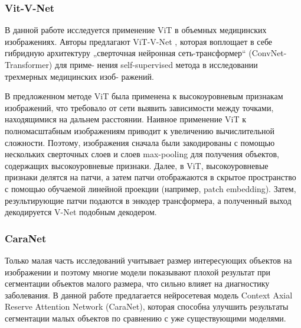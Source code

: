  \subsubsection*{Vit-V-Net}

В данной работе \cite{VitVNet} исследуется применение ViT \cite{Transformers} в объемных медицинских изображениях. 
Авторы предлагают ViT-V-Net \cite{VNet}, которая воплощает в себе гибридную архитектуру
„сверточная нейронная сеть-трансформер“ (ConvNet-Transformer) для приме-
нения self-supervised метода в исследовании трехмерных медицинских изоб-
ражений.\par 

В предложенном методе ViT была применена к высокоуровневым признакам изображений, 
что требовало от сети выявить зависимости между
точками, находящимися на дальнем расстоянии. Наивное применение ViT
к полномасштабным изображениям приводит к увеличению вычислительной
сложности. Поэтому, изображения сначала были закодированы с помощью
нескольких сверточных слоев и слоев max-pooling для получения объектов,
содержащих высокоуровневые признаки. Далее, в ViT, высокоуровневые признаки 
делятся на патчи, а затем патчи отображаются в скрытое пространство
с помощью обучаемой линейной проекции (например, patch embedding). Затем, 
результирующие патчи подаются в энкодер трансформера, а полученный
выход декодируется V-Net подобным декодером.

\subsubsection*{CaraNet}

Только малая часть 
 исследований учитывает размер интересующих объектов на изображении
 и поэтому многие модели показывают плохой результат при сегментации
 объектов малого размера, что сильно влияет на диагностику заболевания.
 В данной работе \cite{CaraNet} предлагается нейросетевая модель Context Axial
 Reserve Attention Network (CaraNet), которая способна улучшить 
 результаты сегментации малых объектов по сравнению с уже существующими
 моделями. \par

